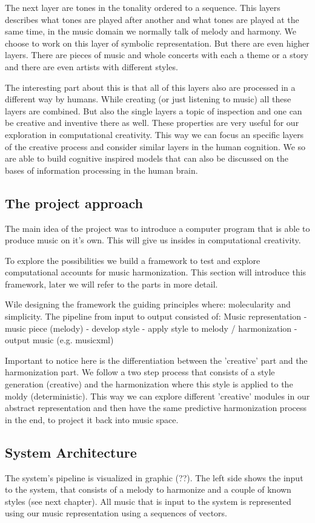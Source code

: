 The next layer are tones in the tonality ordered to a sequence. This layers describes what tones are played after another and what tones are played at the same time, in the music domain we normally talk of melody and harmony. We choose to work on this layer of symbolic representation. But there are even higher layers. There are pieces of music and whole concerts with each a theme or a story and there are even artists with different styles.

The interesting part about this is that all of this layers also are processed in a different way by humans. While creating (or just listening to music) all these layers are combined. But also the single layers a topic of inspection and one can be creative and inventive there as well. These properties are very useful for our exploration in computational creativity. This way we can focus an specific layers of the creative process and consider similar layers in the human cognition. We so are able to build cognitive inspired models that can also be discussed on the bases of information processing in the human brain. 

\subsection{The project approach}
The main idea of the project was to introduce a computer program that is able to produce music on it's own. This will give us insides in computational creativity.

To explore the possibilities we build a framework to test and explore computational accounts for music harmonization. This section will introduce  this framework, later we will refer to the parts in more detail.

Wile designing the framework the guiding principles where: molecularity and simplicity. The pipeline from input to output consisted of: Music representation - music piece (melody) - develop style - apply style to melody / harmonization - output music (e.g. musicxml)

Important to notice here is the differentiation between the 'creative' part and the harmonization part. We follow a two step process that consists of a style generation (creative) and the harmonization where this style is applied to the moldy (deterministic). This way we can explore different 'creative' modules in our abstract representation and then have the same predictive harmonization process in the end, to project it back into music space.

\subsection{System Architecture}
The system's pipeline is visualized in graphic (??). The left side shows the input to the system, that consists of a melody to harmonize  and a couple of known styles (see next chapter). All music that is input to the system is represented using our music representation using a sequences of vectors.

